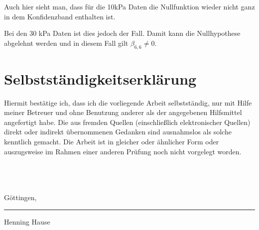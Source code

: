 \documentclass[12pt,a4paper]{article}
\theoremstyle{definition}
\theoremstyle{definition}
\theoremstyle{definition}
\theoremstyle{definition}
\begin{document}
Auch hier sieht man, dass für die 10kPa Daten die Nullfunktion wieder nicht ganz in dem Konfidenzband enthalten ist.

Bei den 30 kPa Daten ist dies jedoch der Fall. Damit kann die Nullhypothese abgelehnt werden und in diesem Fall gilt $\beta_{6,6} \neq 0$.


\nocite{Hsu41}

\newpage
\printbibliography


\newpage
\section*{Selbstständigkeitserklärung}
Hiermit bestätige ich, dass ich die vorliegende Arbeit selbstständig, nur mit Hilfe meiner Betreuer und ohne Benutzung anderer als der angegebenen Hilfsmittel angefertigt habe. Die aus fremden Quellen (einschließlich elektronischer Quellen) direkt oder indirekt übernommenen Gedanken sind ausnahmslos als solche kenntlich gemacht. Die Arbeit ist in gleicher oder ähnlicher Form oder auszugsweise im Rahmen einer anderen Prüfung noch nicht vorgelegt worden.
\\ \\ \\ \\
\parbox{5cm}{\centering Göttingen, }
\hfill\parbox{4cm}{\hrule \strut \centering  \footnotesize Henning Hause}
\end{document}

